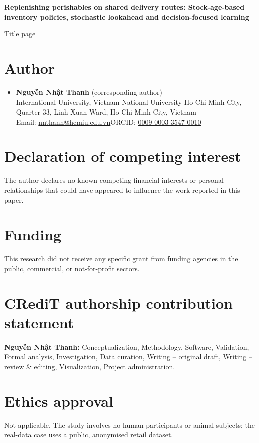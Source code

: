 \documentclass[11pt,a4paper]{article}
\begin{document}
\begin{center}
{\Large\bfseries Replenishing perishables on shared delivery routes: Stock-age-based inventory policies, stochastic lookahead and decision-focused learning\par}
\vspace{1em}
{\large Title page\par}
\end{center}

\section*{Author}
\begin{itemize}[leftmargin=*,label={}]
\item \textbf{Nguyễn Nhật Thanh} (corresponding author)\\
International University, Vietnam National University Ho Chi Minh City, Quarter 33, Linh Xuan Ward, Ho Chi Minh City, Vietnam\\
Email: \href{mailto:nnthanh@hcmiu.edu.vn}{nnthanh@hcmiu.edu.vn}\quad ORCID: \href{https://orcid.org/0009-0003-3547-0010}{0009-0003-3547-0010}
\end{itemize}

\section*{Declaration of competing interest}
The author declares no known competing financial interests or personal relationships that could have appeared to influence the work reported in this paper.

\section*{Funding}
This research did not receive any specific grant from funding agencies in the public, commercial, or not-for-profit sectors.

\section*{CRediT authorship contribution statement}
\textbf{Nguyễn Nhật Thanh:} Conceptualization, Methodology, Software, Validation, Formal analysis, Investigation, Data curation, Writing -- original draft, Writing -- review \& editing, Visualization, Project administration.

\section*{Ethics approval}
Not applicable. The study involves no human participants or animal subjects; the real-data case uses a public, anonymised retail dataset.
\end{document}
